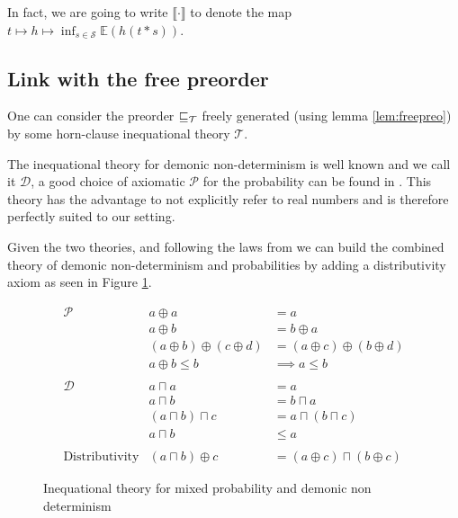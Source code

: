 In fact, we are going to write $\llbracket \cdot \rrbracket$
to denote the map $t \mapsto h \mapsto \inf_{s \in \mathcal{S}} \mathbb{E}(h
(t*s))$.


\subsection{Link with the free preorder}

One can consider the preorder $\sqsubseteq_\mathcal{T}$
freely generated (using lemma \ref{lem:freepreo}) 
by some horn-clause inequational theory $\mathcal{T}$.

The inequational theory for demonic non-determinism
is well known and we call it $\mathcal{D}$, 
a good choice of axiomatic $\mathcal{P}$ for the probability 
can be found in \cite{heckmann1994probabilistic}.
This theory has the advantage to not explicitly refer 
to real numbers and is therefore perfectly suited to 
our setting.

Given the two theories, and following the laws from 
\cite{KeimelP2016} we can build the combined theory
of demonic non-determinism and probabilities by adding 
a distributivity axiom as seen 
in Figure \ref{fig:mixtheory}.

\begin{figure}[h]
    \begin{equation*}
        \begin{array}{lrl}
            \mathcal{P} & a \oplus a &= a \\
                        & a \oplus b &= b \oplus a \\
                        & (a \oplus b) \oplus (c \oplus d) &= (a \oplus c) \oplus (b \oplus d) \\
                        & a \oplus b \leq b &\implies a \leq b  \\
            \\
            \mathcal{D} & a \sqcap a &= a \\
                        & a \sqcap b &= b \sqcap a \\
                        & (a \sqcap b) \sqcap c &= a \sqcap (b \sqcap c) \\
                        & a \sqcap b &\leq a \\ 
            \\
            \text{Distributivity}
            & (a \sqcap b) \oplus c &= (a \oplus c) \sqcap (b \oplus c)
        \end{array}
    \end{equation*}
    \caption{Inequational theory for mixed probability and demonic non
    determinism}
    \label{fig:mixtheory}
\end{figure}

